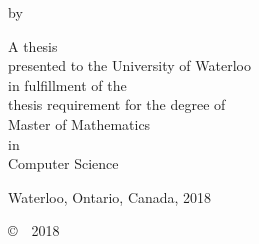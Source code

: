 \pagestyle{empty}

\makeatletter
\begin{titlepage}
    \begin{center}
        \vspace*{1.0cm}

        \Huge
        {\@title}

        \vspace*{1.0cm}

        \normalsize
        by \\

        \vspace*{1.0cm}

        \Large
        \@author

		\vspace*{\fill}

        \normalsize
        A thesis \\
        presented to the University of Waterloo \\
        in fulfillment of the \\
        thesis requirement for the degree of \\
        Master of Mathematics \\
        in \\
        Computer Science \\

        \vspace*{2.0cm}

        Waterloo, Ontario, Canada, 2018 \\

        \vspace*{1.0cm}

        \copyright\ \@author \ 2018 \\
    \end{center}
\end{titlepage}
\makeatother

\pagestyle{plain}
\setcounter{page}{2}
